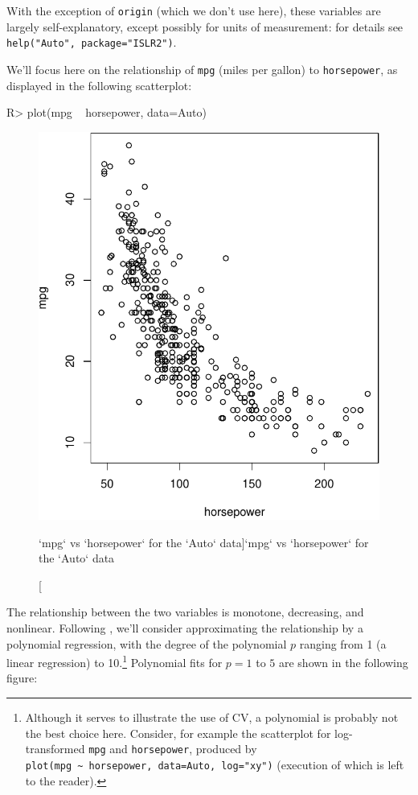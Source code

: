 \documentclass[
]{jss}
\begin{document}
With the exception of \texttt{origin} (which we don't use here), these
variables are largely self-explanatory, except possibly for units of
measurement: for details see \texttt{help("Auto",\ package="ISLR2")}.

We'll focus here on the relationship of \texttt{mpg} (miles per gallon)
to \texttt{horsepower}, as displayed in the following scatterplot:

\begin{CodeChunk}
\begin{CodeInput}
R> plot(mpg ~ horsepower, data=Auto)
\end{CodeInput}
\begin{figure}

{\centering \includegraphics[width=1\linewidth]{JSS-article-reduced_files/figure-latex/mpg-horsepower-scatterplot-1} 

}

\caption[`mpg` vs `horsepower` for the `Auto` data]{`mpg` vs `horsepower` for the `Auto` data}\label{fig:mpg-horsepower-scatterplot}
\end{figure}
\end{CodeChunk}

The relationship between the two variables is monotone, decreasing, and
nonlinear. Following \citet{JamesEtAl:2021}, we'll consider
approximating the relationship by a polynomial regression, with the
degree of the polynomial \(p\) ranging from 1 (a linear regression) to
10.\footnote{Although it serves to illustrate the use of CV, a
  polynomial is probably not the best choice here. Consider, for example
  the scatterplot for log-transformed \texttt{mpg} and
  \texttt{horsepower}, produced by
  \texttt{plot(mpg\ \textasciitilde{}\ horsepower,\ data=Auto,\ log="xy")}
  (execution of which is left to the reader).} Polynomial fits for
\(p = 1\) to \(5\) are shown in the following figure:
\end{document}
